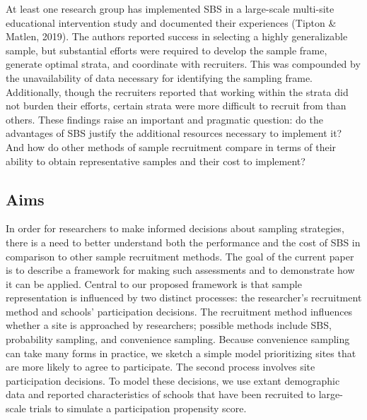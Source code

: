 \documentclass[
  english,
  man,floatsintext]{apa6}
\begin{document}
At least one research group has implemented SBS in a large-scale multi-site educational intervention study and documented their experiences (Tipton \& Matlen, 2019). The authors reported success in selecting a highly generalizable sample, but substantial efforts were required to develop the sample frame, generate optimal strata, and coordinate with recruiters.
This was compounded by the unavailability of data necessary for identifying the sampling frame.
Additionally, though the recruiters reported that working within the strata did not burden their efforts, certain strata were more difficult to recruit from than others.
These findings raise an important and pragmatic question: do the advantages of SBS justify the additional resources necessary to implement it?
And how do other methods of sample recruitment compare in terms of their ability to obtain representative samples and their cost to implement?

\hypertarget{aims}{%
\subsection*{Aims}\label{aims}}

In order for researchers to make informed decisions about sampling strategies, there is a need to better understand both the performance and the cost of SBS in comparison to other sample recruitment methods.
The goal of the current paper is to describe a framework for making such assessments and to demonstrate how it can be applied.
Central to our proposed framework is that sample representation is influenced by two distinct processes: the researcher's recruitment method and schools' participation decisions.
The recruitment method influences whether a site is approached by researchers; possible methods include SBS, probability sampling, and convenience sampling.
Because convenience sampling can take many forms in practice, we sketch a simple model prioritizing sites that are more likely to agree to participate.
The second process involves site participation decisions.
To model these decisions, we use extant demographic data and reported characteristics of schools that have been recruited to large-scale trials to simulate a participation propensity score.
\end{document}
